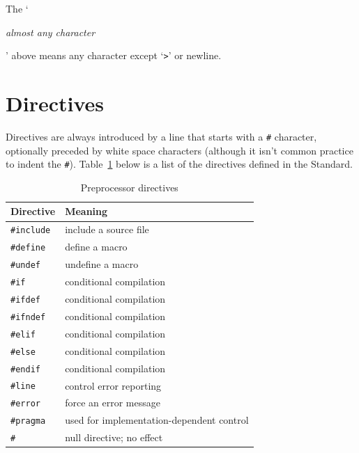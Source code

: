   The `\begin{center}\textit{almost any character}\end{center}

' above means any character
   except `\texttt{>}' or newline.


 
   \section{Directives}
        

  

  Directives are always introduced by a line that starts with
   a \texttt{\#} character, optionally preceded by white space characters
   (although it isn't common practice to indent the \texttt{\#}).
   Table~\ref{tab:prepDir} below is a list of the directives defined in the
   Standard.


   \begin{table}[htb]
     \centering
     \begin{tabular}{ll}
       \toprule
       Directive          & Meaning   \\
       \midrule
       \texttt{\#include} & include a source file   \\
       \texttt{\#define}  & define a macro   \\
       \texttt{\#undef}   & undefine a macro   \\
       \texttt{\#if}      & conditional compilation   \\
       \texttt{\#ifdef}   & conditional compilation   \\
       \texttt{\#ifndef}  & conditional compilation   \\
       \texttt{\#elif}    & conditional compilation   \\
       \texttt{\#else}    & conditional compilation   \\
       \texttt{\#endif}   & conditional compilation   \\
       \texttt{\#line}    & control error reporting   \\
       \texttt{\#error}   & force an error message   \\
       \texttt{\#pragma}  & used for implementation-dependent control   \\
       \texttt{\#}        & null directive; no effect   \\
       \bottomrule
     \end{tabular}
     \caption{\label{tab:prepDir}Preprocessor directives}
   \end{table}


